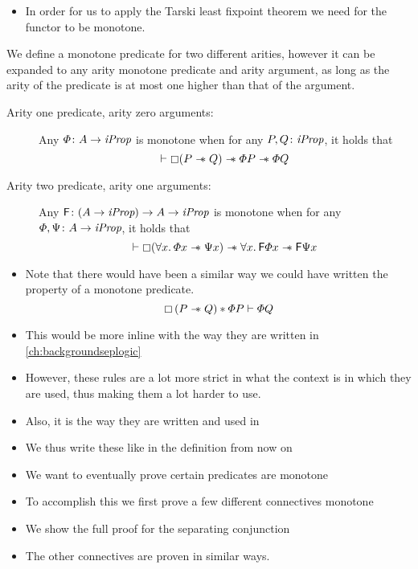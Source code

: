 \documentclass[thesis.tex]{subfiles}
\begin{document}
\begin{itemize}
    \item In order for us to apply the Tarski least fixpoint theorem we need for the functor to be monotone.
\end{itemize}
\begin{definition}
    We define a monotone predicate for two different arities, however it can be expanded to any arity monotone predicate and arity argument, as long as the arity of the predicate is at most one higher than that of the argument.
    \begin{description}
        \item[Arity one predicate, arity zero arguments:] Any $\varPhi\colon A \to \textit{iProp}$ is monotone when for any $P, Q\colon \textit{iProp}$, it holds that
            \[\vdash \mathop{\boxempty}(P \mathrel{-\!\!\ast} Q) \mathrel{-\!\!\ast} \varPhi P \mathrel{-\!\!\ast} \varPhi Q\]
        \item[Arity two predicate, arity one arguments:] Any $\textsf{\upshape F}\colon (A \to \textit{iProp}) \to  A \to \textit{iProp}$ is monotone when for any $\varPhi, \Psi\colon A \to \textit{iProp}$, it holds that
            \[\proves \always(\All \var. \pred\var \wand \predB\var) \wand \All \var. \hopred\pred\var \wand \hopred\predB\var\]
    \end{description}
\end{definition}
\begin{itemize}
    \item Note that there would have been a similar way we could have written the property of a monotone predicate.
          \[
              \mathop{\boxempty}{(P \mathrel{-\!\!\ast} Q)} * \varPhi P \vdash \varPhi Q
          \]
    \item This would be more inline with the way they are written in \cref*{ch:backgroundseplogic}
    \item However, these rules are a lot more strict in what the context is in which they are used, thus making them a lot harder to use.
    \item Also, it is the way they are written and used in \iris
    \item We thus write these like in the definition from now on
\end{itemize}

\begin{itemize}
    \item We want to eventually prove certain predicates are monotone
    \item To accomplish this we first prove a few different connectives monotone
    \item We show the full proof for the separating conjunction
    \item The other connectives are proven in similar ways.
\end{itemize}
\end{document}
